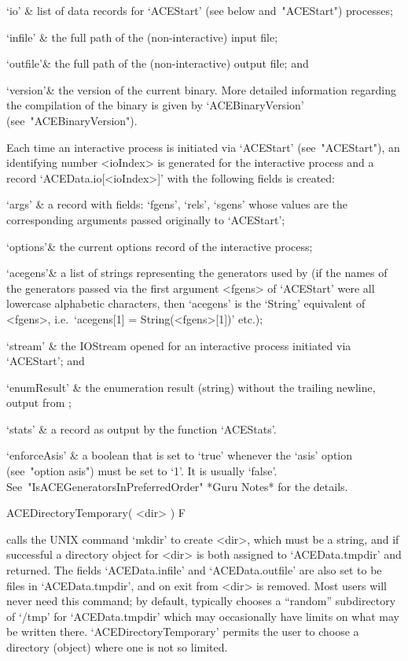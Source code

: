 \quad`io'     & list  of  data  records  for  `ACEStart'   (see  below 
and~"ACEStart") processes;

\quad`infile' & the full path of the  (non-interactive)  {\ACE}  input
file;

\quad`outfile'& the full path of the (non-interactive)  {\ACE}  output
file; and

\quad`version'& the  version  of  the  current  {\ACE}  binary.   More
detailed information regarding the compilation of the binary is  given
by `ACEBinaryVersion' (see~"ACEBinaryVersion").

\enditems

Each time an interactive {\ACE} process is  initiated  via  `ACEStart'
(see~"ACEStart"), an identifying number <ioIndex> is generated for the
interactive process and  a  record  `ACEData.io[<ioIndex>]'  with  the
following fields is created:

\beginitems

\quad`args'   & a record with fields: `fgens', `rels',  `sgens'  whose
values  are  the  corresponding   arguments   passed   originally   to
`ACEStart';

\quad`options'& the current options record of the interactive process;

\quad`acegens'& a list of strings representing the generators used  by
{\ACE} (if the names of the generators passed via the  first  argument
<fgens> of `ACEStart' were all lowercase alphabetic  characters,  then
`acegens' is the `String' equivalent of <fgens>,  i.e.~`acegens[1]   =
String(<fgens>[1])' etc.);

\quad`stream' & the IOStream opened for an interactive {\ACE}  process
initiated via `ACEStart'; and

\quad`enumResult' & 
the enumeration result (string) without the trailing  newline,  output
from {\ACE};

\quad`stats'  & a record as output by the function `ACEStats'.

\quad`enforceAsis' & 
a  boolean  that  is  set  to  `true'  whenever  the   `asis'   option
(see~"option asis") must  be  set  to  `1'.  It  is  usually  `false'.
See~"IsACEGeneratorsInPreferredOrder" *Guru Notes* for the details.

\enditems

\>ACEDirectoryTemporary( <dir> ) F

calls the UNIX command `mkdir'  to  create  <dir>,  which  must  be  a
string, and if  successful  a  directory  object  for  <dir>  is  both
assigned to `ACEData.tmpdir' and returned. The fields `ACEData.infile'
and `ACEData.outfile' are also set to be  files  in  `ACEData.tmpdir',
and on exit from {\GAP} <dir> is removed. Most users will  never  need
this command;  by  default,  {\GAP}  typically  chooses  a  ``random''
subdirectory of `/tmp' for  `ACEData.tmpdir'  which  may  occasionally
have limits on what  may  be  written  there.  `ACEDirectoryTemporary'
permits the user to choose a directory (object) where one  is  not  so
limited.


